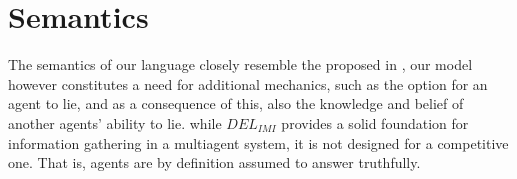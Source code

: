 \section{Semantics}
The semantics of our language closely resemble the proposed in \cite{delimi},
our model however constitutes a need for additional mechanics, such as the
option for an agent to lie, and as a consequence of this, also the knowledge
and belief of another agents' ability to lie. while $DEL_{IMI}$ provides a
solid foundation for information gathering in a multiagent system, it is not
designed for a competitive one. That is, agents are by definition assumed to
answer truthfully.